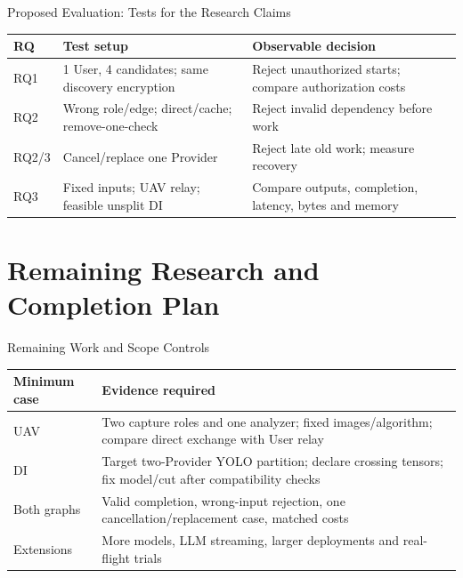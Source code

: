 \begin{frame}{Proposed Evaluation: Tests for the Research Claims}
\small
\begin{tabularx}{\linewidth}{p{.09\linewidth}XX}
\toprule RQ & Test setup & Observable decision\\\midrule
RQ1 & 1 User, 4 candidates; same discovery encryption & Reject unauthorized starts; compare authorization costs\\\midrule
RQ2 & Wrong role/edge; direct/cache; remove-one-check & Reject invalid dependency before work\\\midrule
RQ2/3 & Cancel/replace one Provider & Reject late old work; measure recovery\\\midrule
RQ3 & Fixed inputs; UAV relay; feasible unsplit DI & Compare outputs, completion, latency, bytes and memory\\\bottomrule
\end{tabularx}
\vspace{1mm}
\end{frame}

\section{Remaining Research and Completion Plan}
\begin{frame}{Remaining Work and Scope Controls}
\small
\begin{tabularx}{\linewidth}{p{.23\linewidth}X}
\toprule Minimum case & Evidence required\\\midrule
UAV & Two capture roles and one analyzer; fixed images/algorithm; compare direct exchange with User relay\\\midrule
DI & Target two-Provider YOLO partition; declare crossing tensors; fix model/cut after compatibility checks\\\midrule
Both graphs & Valid completion, wrong-input rejection, one cancellation/replacement case, matched costs\\\midrule
Extensions & More models, LLM streaming, larger deployments and real-flight trials\\\bottomrule
\end{tabularx}
\vspace{3mm}
\end{frame}

